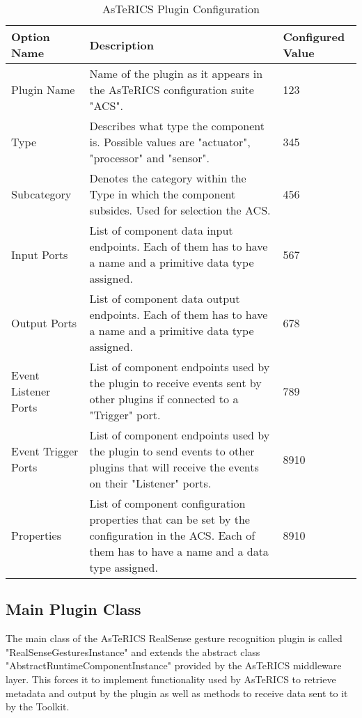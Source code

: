 \documentclass[BSA,Bachelor,english]{twbook}%
\begin{document}
\begin{table}[H]
	\centering
	\caption{AsTeRICS Plugin Configuration}
	\label{plugin-config}
	\begin{tabularx}{\textwidth}{|l|X|l|}
	\hline
	\textbf{Option Name}          & \textbf{Description} & \textbf{Configured Value} \\ \hline
	Plugin Name          & Name of the plugin as it appears in the AsTeRICS configuration suite "ACS".        & 123              \\ \hline
	Type                 & Describes what type the component is. Possible values are  "actuator", "processor" and "sensor".       & 345              \\ \hline
	Subcategory          & Denotes the category within the Type in which the component subsides. Used for selection the ACS.        & 456              \\ \hline
	Input Ports          & List of component data input endpoints. Each of them has to have a name and a primitive data type assigned.        & 567              \\ \hline
	Output Ports         & List of component data output endpoints. Each of them has to have a name and a primitive data type assigned.        & 678              \\ \hline
	Event Listener Ports & List of component endpoints used by the plugin to receive events sent by other plugins if connected to a "Trigger" port.        & 789              \\ \hline
	Event Trigger Ports           & List of component endpoints used by the plugin to send events to other plugins that will receive the events on their "Listener" ports.        & 8910             \\ \hline
	Properties           & List of component configuration properties that can be set by the configuration in the ACS. Each of them has to have a name and a data type assigned.        & 8910             \\ \hline
	\end{tabularx}
\end{table}

\subsection{Main Plugin Class}

The main class of the AsTeRICS RealSense gesture recognition plugin is called "RealSenseGesturesInstance" and extends the abstract class "AbstractRuntimeComponentInstance" provided by the AsTeRICS middleware layer. This forces it to implement functionality used by AsTeRICS to retrieve metadata and output by the plugin as well as methods to receive data sent to it by the Toolkit.
\end{document}
